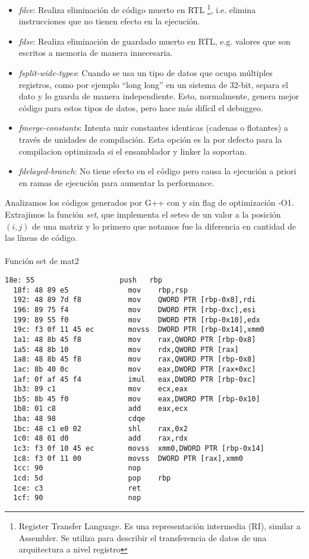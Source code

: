 \begin{itemize}
	\item \textit{fdce}: Realiza eliminación de código muerto en RTL \footnote{Register Transfer Language. Es una representación intermedia (RI), similar a Assembler. Se utiliza para describir el transferencia de datos de una arquitectura a nivel registro}, i.e. elimina instrucciones que no tienen efecto en la ejecución.
	\item \textit{fdse}: Realiza eliminación de guardado muerto en RTL, e.g. valores que son escritos a memoria de manera innecesaria.
	\item \textit{fsplit-wide-types}: Cuando se usa un tipo de datos que ocupa múltiples registros, como por ejemplo ``long long'' en un sistema de 32-bit, separa el dato y lo guarda de manera independiente. Esto, normalmente, genera mejor código para estos tipos de datos, pero hace más difícil el debuggeo.
	\item \textit{fmerge-constants}: Intenta unir constantes identicas (cadenas o flotantes) a través de unidades de compilación. Esta opción es la por defecto para la compilacion optimizada si el ensamblador y linker la soportan.
	\item \textit{fdelayed-branch}: No tiene efecto en el código pero causa la ejecución a priori en ramas de ejecución para aumentar la performance.
\end{itemize}

Analizamos los códigos generados por G++ con y sin flag de optimización -O1. Extrajimos la función \textit{set}, que implementa el seteo de un valor a la posición $(i, j)$ de una matriz y lo primero que notamos fue la diferencia en cantidad de las líneas de código.~\\
~\\
{\center\large{Función set de mat2}}
\begin{lstlisting}[]
  18e: 55                    push   rbp
  18f: 48 89 e5              mov    rbp,rsp
  192: 48 89 7d f8           mov    QWORD PTR [rbp-0x8],rdi
  196: 89 75 f4              mov    DWORD PTR [rbp-0xc],esi
  199: 89 55 f0              mov    DWORD PTR [rbp-0x10],edx
  19c: f3 0f 11 45 ec        movss  DWORD PTR [rbp-0x14],xmm0
  1a1: 48 8b 45 f8           mov    rax,QWORD PTR [rbp-0x8]
  1a5: 48 8b 10              mov    rdx,QWORD PTR [rax]
  1a8: 48 8b 45 f8           mov    rax,QWORD PTR [rbp-0x8]
  1ac: 8b 40 0c              mov    eax,DWORD PTR [rax+0xc] 
  1af: 0f af 45 f4           imul   eax,DWORD PTR [rbp-0xc]
  1b3: 89 c1                 mov    ecx,eax
  1b5: 8b 45 f0              mov    eax,DWORD PTR [rbp-0x10]
  1b8: 01 c8                 add    eax,ecx
  1ba: 48 98                 cdqe   
  1bc: 48 c1 e0 02           shl    rax,0x2
  1c0: 48 01 d0              add    rax,rdx
  1c3: f3 0f 10 45 ec        movss  xmm0,DWORD PTR [rbp-0x14]
  1c8: f3 0f 11 00           movss  DWORD PTR [rax],xmm0
  1cc: 90                    nop
  1cd: 5d                    pop    rbp
  1ce: c3                    ret    
  1cf: 90                    nop
\end{lstlisting}

